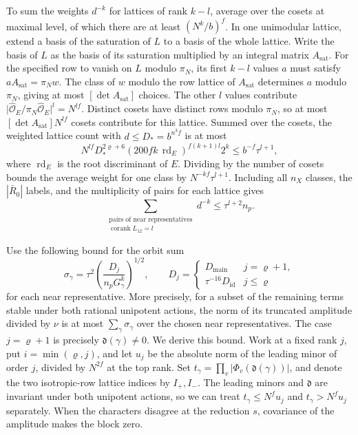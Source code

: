 To sum the weights \(d^{-k}\) for lattices of rank \(k-l\), average over
the cosets at maximal level, of which there are at least \((N^k/b)^f\).
In one unimodular lattice, extend a basis of the saturation of \(L\)
to a basis of the whole lattice. Write the basis of \(L\) as the
basis of its saturation multiplied by an integral matrix \(A_{\mathrm{sat}}\).
For the specified row to vanish on \(L\) modulo \(\pi_N\), its first
\(k-l\) values \(a\) must satisfy \(aA_{\mathrm{sat}}=\pi_N w\).
The class of \(w\) modulo the row lattice of \(A_{\mathrm{sat}}\) determines
\(a\) modulo \(\pi_N\), giving at most \([\det A_{\mathrm{sat}}]\) choices.
The other \(l\) values contribute
\(\bigl|\widehat{\mathcal O}_E/\pi_N\widehat{\mathcal O}_E\bigr|^l=N^{lf}\).
Distinct cosets have distinct rows modulo \(\pi_N\), so at most
\([\det A_{\mathrm{sat}}]N^{lf}\) cosets contribute for this lattice. Summed over the cosets, the weighted
lattice count with \(d\le D_\ast=b^{n^3f}\) is at most
\[
  N^{lf}D_\ast^{2\varrho+6}
       (200fk\,\operatorname{rd}_E)^{f(k+1)l}2^k
  \le b^{-f}\tau^{l+1},
\]
where \(\operatorname{rd}_E\) is the root discriminant of \(E\). Dividing by
the number of cosets bounds the average weight for one class by
\(N^{-kf}\tau^{l+1}\). Including all \(n_X\) classes, the \(|\bar R_0|\)
labels, and the multiplicity of pairs for each lattice gives
\begin{equation}\label{eq:span-pair-count}
 \sum_{\substack{\text{pairs of near representatives}\\
                            \operatorname{corank} L_{12}=l}}d^{-k}
 \le \tau^{l+2}n_p .
\end{equation}

Use the following bound for the orbit sum
\[
 \sigma_\gamma=\tau^2\left(\frac{D_j}{n_pG_\gamma^k}\right)^{1/2},
 \qquad
 D_j=\begin{cases}
       D_{\mathrm{main}} & j=\varrho+1,\\
       \tau^{-16}D_{\mathrm{id}} & j\le\varrho
     \end{cases}
\]
for each near representative. More precisely, for a subset of the
remaining terms stable under both rational unipotent actions, the norm
of its truncated amplitude divided by \(\nu\) is at most \(\sum_\gamma\sigma_\gamma\) over
the chosen near representatives. The case \(j=\varrho+1\) is precisely
\(\mathfrak d(\gamma)\ne0\).
We derive this bound. Work at a fixed rank \(j\), put \(i=\min(\varrho,j)\),
and let \(u_j\) be the absolute norm of the leading minor of order \(j\),
divided by \(N^{2f}\) at the top rank. Set
\(t_\gamma=\prod_v|\Phi_v(\mathfrak d(\gamma))|\), and denote the two
isotropic-row lattice indices by \(I_+,I_-\).
The leading minors and \(\mathfrak d\) are invariant under both
unipotent actions, so we can treat \(t_\gamma\le N^fu_j\) and
\(t_\gamma>N^fu_j\) separately. When the characters disagree at the
reduction \(s\), covariance of the amplitude makes the block zero.

